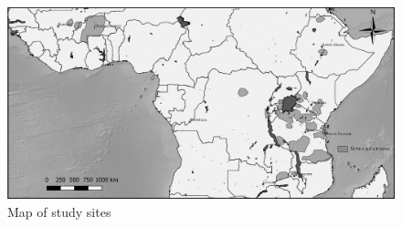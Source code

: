 \begin{figure}
    \includegraphics[width=1\textwidth]{figs_01/siteMap.png}
  \captionsetup{singlelinecheck = false, justification=justified} %
  \caption{Map of study sites}
    \label{fig:01_3} %
\end{figure}
